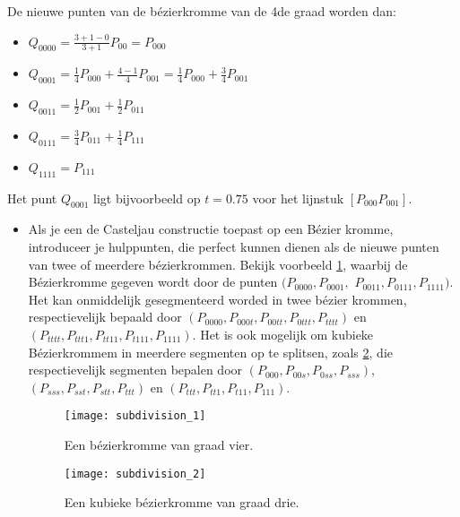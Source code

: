 \documentclass{report}
\begin{document}
\begin{itemize}
{\begin{itemize}
			      De nieuwe punten van de bézierkromme van de 4de graad worden dan:
			      \begin{itemize}
			      	\item $Q_{0000} =\frac{3 + 1 - 0}{3 + 1}P_{00} = P_{000}$
			      	\item $Q_{0001} = \frac{1}{4}P_{000} + \frac{4 - 1}{4}P_{001} = \frac{1}{4}P_{000} + \frac{3}{4}P_{001}$
			      	\item $Q_{0011} = \frac{1}{2}P_{001} + \frac{1}{2}P_{011}$
			      	\item $Q_{0111} = \frac{3}{4}P_{011} + \frac{1}{4}P_{111}$
			      	\item $Q_{1111} = P_{111}$
			      \end{itemize}
			      Het punt $Q_{0001}$ ligt bijvoorbeeld op $t = 0.75$ voor het lijnstuk $[P_{000}P_{001}]$.
		\end{itemize}}

		{
			\begin{itemize} 
				\item Als je een de Casteljau constructie toepast op een Bézier kromme, introduceer je hulppunten, die perfect kunnen dienen als de nieuwe punten van twee of meerdere bézierkrommen. Bekijk voorbeeld \ref{fig:subdivision_1}, waarbij de Bézierkromme gegeven wordt door de punten $(P_{0000}, P_{0001},$ $P_{0011}, P_{0111}, P_{1111})$. Het kan onmiddelijk gesegmenteerd worded in twee bézier krommen, respectievelijk bepaald door $(P_{0000},P_{000t},P_{00tt},P_{0ttt},P_{tttt})$ en $(P_{tttt},P_{ttt1},P_{tt11},P_{t111},P_{1111})$. Het is ook mogelijk om kubieke Bézierkrommem in meerdere segmenten op te splitsen, zoals \ref{fig:subdivision_2}, die respectievelijk segmenten bepalen door $(P_{000}, P_{00s}, P_{0ss}, P_{sss})$, $(P_{sss}, P_{sst}, P_{stt}, P_{ttt})$ en $(P_{ttt}, P_{tt1}, P_{t11}, P_{111})$. 
				\begin{figure}[ht]
					\centering
					\texttt{[image: subdivision\_1]}
					\caption{Een bézierkromme van graad vier.}
					\label{fig:subdivision_1}
				\end{figure}
				\begin{figure}[ht]
					\centering
					\texttt{[image: subdivision\_2]}
					\caption{Een kubieke bézierkromme van graad drie.}
					\label{fig:subdivision_2}
				\end{figure}
			

\end{itemize}}
\end{itemize}
\end{document}
